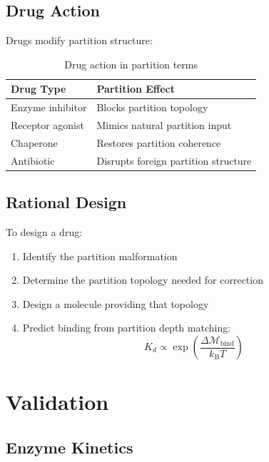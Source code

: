 \documentclass[twocolumn,10pt,a4paper]{article}
\theoremstyle{definition}
\theoremstyle{remark}
\newcommand{\kB}{k_{\mathrm{B}}}
\newcommand{\Depth}{\mathcal{M}}
\begin{document}
\subsection{Drug Action}

Drugs modify partition structure:

\begin{table}[h]
\centering
\caption{Drug action in partition terms}
\label{tab:drugs}
\begin{tabular}{ll}
\toprule
Drug Type & Partition Effect \\
\midrule
Enzyme inhibitor & Blocks partition topology \\
Receptor agonist & Mimics natural partition input \\
Chaperone & Restores partition coherence \\
Antibiotic & Disrupts foreign partition structure \\
\bottomrule
\end{tabular}
\end{table}

\subsection{Rational Design}

To design a drug:
\begin{enumerate}
    \item Identify the partition malformation
    \item Determine the partition topology needed for correction
    \item Design a molecule providing that topology
    \item Predict binding from partition depth matching:
    \begin{equation}
        K_d \propto \exp\left(\frac{\Delta\Depth_{\mathrm{bind}}}{\kB T}\right)
    \end{equation}
\end{enumerate}

\section{Validation}
\label{sec:validation}

\subsection{Enzyme Kinetics}
\end{document}
